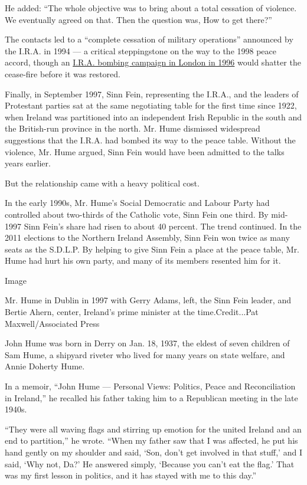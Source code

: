 He added: ``The whole objective was to bring about a total cessation of
violence. We eventually agreed on that. Then the question was, How to
get there?''

The contacts led to a ``complete cessation of military operations''
announced by the I.R.A. in 1994 --- a critical steppingstone on the way
to the 1998 peace accord, though an
\href{https://www.nytimes3xbfgragh.onion/1996/02/10/world/bomb-wounds-100-in-london-as-ira-truce-is-said-to-end.html}{I.R.A.
bombing campaign in London in 1996} would shatter the cease-fire before
it was restored.

Finally, in September 1997, Sinn Fein, representing the I.R.A., and the
leaders of Protestant parties sat at the same negotiating table for the
first time since 1922, when Ireland was partitioned into an independent
Irish Republic in the south and the British-run province in the north.
Mr. Hume dismissed widespread suggestions that the I.R.A. had bombed its
way to the peace table. Without the violence, Mr. Hume argued, Sinn Fein
would have been admitted to the talks years earlier.

But the relationship came with a heavy political cost.

In the early 1990s, Mr. Hume's Social Democratic and Labour Party had
controlled about two-thirds of the Catholic vote, Sinn Fein one third.
By mid-1997 Sinn Fein's share had risen to about 40 percent. The trend
continued. In the 2011 elections to the Northern Ireland Assembly, Sinn
Fein won twice as many seats as the S.D.L.P. By helping to give Sinn
Fein a place at the peace table, Mr. Hume had hurt his own party, and
many of its members resented him for it.

Image

Mr. Hume in Dublin in 1997 with Gerry Adams, left, the Sinn Fein leader,
and Bertie Ahern, center, Ireland's prime minister at the
time.Credit...Pat Maxwell/Associated Press

John Hume was born in Derry on Jan. 18, 1937, the eldest of seven
children of Sam Hume, a shipyard riveter who lived for many years on
state welfare, and Annie Doherty Hume.

In a memoir, ``John Hume --- Personal Views: Politics, Peace and
Reconciliation in Ireland,'' he recalled his father taking him to a
Republican meeting in the late 1940s.

``They were all waving flags and stirring up emotion for the united
Ireland and an end to partition,'' he wrote. ``When my father saw that I
was affected, he put his hand gently on my shoulder and said, `Son,
don't get involved in that stuff,' and I said, `Why not, Da?' He
answered simply, `Because you can't eat the flag.' That was my first
lesson in politics, and it has stayed with me to this day.''

